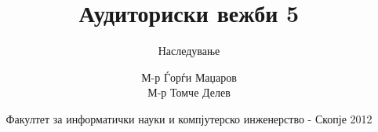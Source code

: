 

\author[АВ5]{М-р Ѓорѓи Маџаров\\М-р Томче Делев}
\title[Објектно ориентирано програмирање]{Аудиториски вежби 5}
\subtitle{Наследување}
\date{Факултет за информатички науки и компјутерско инженерство - Скопје 2012}





\frame[t,plain]{\titlepage}






